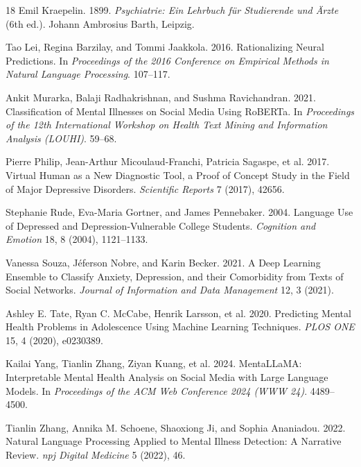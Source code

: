 \documentclass[sigconf]{acmart}
\begin{document}
\begin{thebibliography}{18}
Emil Kraepelin. 1899. \textit{Psychiatrie: Ein Lehrbuch für Studierende und Ärzte} (6th ed.). Johann Ambrosius Barth, Leipzig.

Tao Lei, Regina Barzilay, and Tommi Jaakkola. 2016. Rationalizing Neural Predictions. In \textit{Proceedings of the 2016 Conference on Empirical Methods in Natural Language Processing}. 107--117.

Ankit Murarka, Balaji Radhakrishnan, and Sushma Ravichandran. 2021. Classification of Mental Illnesses on Social Media Using RoBERTa. In \textit{Proceedings of the 12th International Workshop on Health Text Mining and Information Analysis (LOUHI)}. 59--68.

Pierre Philip, Jean-Arthur Micoulaud-Franchi, Patricia Sagaspe, et al. 2017. Virtual Human as a New Diagnostic Tool, a Proof of Concept Study in the Field of Major Depressive Disorders. \textit{Scientific Reports} 7 (2017), 42656.

Stephanie Rude, Eva-Maria Gortner, and James Pennebaker. 2004. Language Use of Depressed and Depression-Vulnerable College Students. \textit{Cognition and Emotion} 18, 8 (2004), 1121--1133.

Vanessa Souza, Jéferson Nobre, and Karin Becker. 2021. A Deep Learning Ensemble to Classify Anxiety, Depression, and their Comorbidity from Texts of Social Networks. \textit{Journal of Information and Data Management} 12, 3 (2021).

Ashley E. Tate, Ryan C. McCabe, Henrik Larsson, et al. 2020. Predicting Mental Health Problems in Adolescence Using Machine Learning Techniques. \textit{PLOS ONE} 15, 4 (2020), e0230389.

Kailai Yang, Tianlin Zhang, Ziyan Kuang, et al. 2024. MentaLLaMA: Interpretable Mental Health Analysis on Social Media with Large Language Models. In \textit{Proceedings of the ACM Web Conference 2024 (WWW 24)}. 4489--4500.

Tianlin Zhang, Annika M. Schoene, Shaoxiong Ji, and Sophia Ananiadou. 2022. Natural Language Processing Applied to Mental Illness Detection: A Narrative Review. \textit{npj Digital Medicine} 5 (2022), 46.

\end{thebibliography}
\end{document}
